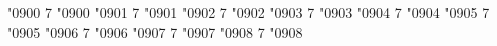 %
\newcommand*{\chemalpha}{\textrm{α}}
\newcommand*{\chembeta}{\textrm{β}}
\newcommand*{\chemgamma}{\textrm{γ}}
\newcommand*{\chemdelta}{\textrm{δ}}
\newcommand*{\chemepsilon}{\textrm{ε}}
\newcommand*{\chemzeta}{\textrm{ζ}}
\newcommand*{\chemeta}{\textrm{η}}
\newcommand*{\chemtheta}{\textrm{θ}}
\newcommand*{\chemiota}{\textrm{ι}}
\newcommand*{\chemkappa}{\textrm{\char"03F0}}
\newcommand*{\chemlambda}{\textrm{λ}}
\newcommand*{\chemmu}{\textrm{μ}}
\newcommand*{\chemnu}{\textrm{ν}}
\newcommand*{\chemxi}{\textrm{ξ}}
\newcommand*{\chemomicron}{\textrm{ο}}
\newcommand*{\chempi}{\textrm{π}}
\newcommand*{\chemrho}{\textrm{ρ}}
\newcommand*{\chemrhoalt}{\textrm{\char"03F1}}
\newcommand*{\chemsigma}{\textrm{σ}}
\newcommand*{\chemsigmaalt}{\textrm{ς}}
\newcommand*{\chemtau}{\textrm{τ}}
\newcommand*{\chemupsilon}{\textrm{υ}}
\newcommand*{\chemphi}{\textrm{φ}}
\newcommand*{\chemchi}{\textrm{χ}}
\newcommand*{\chempsi}{\textrm{ψ}}
\newcommand*{\chemomega}{\textrm{ω}}
%
\newcommand*{\chemAlpha}{\textrm{Α}}
\newcommand*{\chemBeta}{\textrm{Β}}
\newcommand*{\chemGamma}{\textrm{Γ}}
\newcommand*{\chemDelta}{\textrm{Δ}}
\newcommand*{\chemEpsilon}{\textrm{Ε}}
\newcommand*{\chemZeta}{\textrm{Ζ}}
\newcommand*{\chemEta}{\textrm{Η}}
\newcommand*{\chemTheta}{\textrm{Θ}}
\newcommand*{\chemIota}{\textrm{Ι}}
\newcommand*{\chemKappa}{\textrm{Κ}}
\newcommand*{\chemLambda}{\textrm{Λ}}
\newcommand*{\chemMu}{\textrm{Μ}}
\newcommand*{\chemNu}{\textrm{Ν}}
\newcommand*{\chemXi}{\textrm{Ξ}}
\newcommand*{\chemOmicron}{\textrm{Ο}}
\newcommand*{\chemPi}{\textrm{Π}}
\newcommand*{\chemRho}{\textrm{Ρ}}
\newcommand*{\chemSigma}{\textrm{Σ}}
\newcommand*{\chemTau}{\textrm{Τ}}
\newcommand*{\chemUpsilon}{\textrm{Υ}}
\newcommand*{\chemPhi}{\textrm{Φ}}
\newcommand*{\chemChi}{\textrm{Χ}}
\newcommand*{\chemPsi}{\textrm{Ψ}}
\newcommand*{\chemOmega}{\textrm{Ω}}
%
\Umathcode "0900 7 \symoperators "0900%
\Umathcode "0901 7 \symoperators "0901%
\Umathcode "0902 7 \symoperators "0902%
\Umathcode "0903 7 \symoperators "0903%
\Umathcode "0904 7 \symoperators "0904%
\Umathcode "0905 7 \symoperators "0905%
\Umathcode "0906 7 \symoperators "0906%
\Umathcode "0907 7 \symoperators "0907%
\Umathcode "0908 7 \symoperators "0908%
